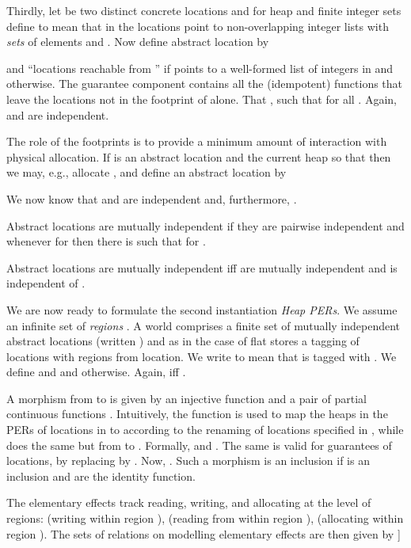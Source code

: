 \documentclass[orivec]{llncs}
\makeatletter
\newif\iffull\fullfalse
\renewcommand\subsection{\@startsection{subsection}{2}{\z@}{-2\p@ \@plus -4\p@ \@minus -4\p@}{-0.5em \@plus -0.22em \@minus -0.1em}{\normalfont\normalsize\bfseries}}
\makeatother
\begin{document}
Thirdly, let  be two distinct concrete locations and
for heap  and finite integer sets  define
 to mean that in  the locations  point to non-overlapping integer lists with \emph{sets} of
elements  and . Now define abstract location  by
 
 and  ``locations reachable from
'' if  points to a well-formed list of integers in
 and  otherwise. The guarantee component 
contains all the (idempotent) functions  that leave the locations
not in the footprint of  alone. That ,
such that  for all .
Again,  and  are independent.

The role of the footprints  is to provide a minimum amount of
interaction with physical allocation. If  is an abstract
location and  the current heap so that
 then we may, e.g., allocate
, and define an abstract location
 by



\noindent
We now know that  and  are independent and, furthermore, 
. 
\begin{definition}
Abstract  locations  are mutually independent if they are pairwise independent and whenever  for  then there is  such that  for . 
\end{definition}
\begin{lemma}
Abstract locations  are mutually independent iff  are mutually independent and  is independent of . 
\end{lemma}
\subsection{Heap PERs}
We are now ready to formulate the \iffull third \else second \fi
instantiation \emph{Heap
  PERs}. We assume an infinite set of \emph{regions} . A
world  comprises a finite set of mutually independent abstract
locations (written ) and as in the case of flat stores a tagging of 
locations with regions from  
location. We write  to mean that 
is tagged with . We define  and
 and  otherwise. Again, 
iff . 

A morphism from  to  is given by an injective function  and a pair of partial continuous functions
. Intuitively, the function 
is used
to map the heaps in the PERs of locations in  to  according to the
renaming of locations specified in , while 
does the same but from  to . Formally,
 and . The same is valid for 
guarantees of locations, by replacing  by .
Now, .  Such a morphism  is an inclusion if
 is an inclusion and  are the identity function.

The elementary effects track reading, writing, and allocating at the
level of regions:  (writing within
region ),  (reading from within region ),
 (allocating within region ).
The sets of relations on  modelling elementary effects are then
given by 
\iffull
2pt]
\end{document}
